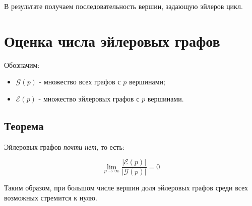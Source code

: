 {В результате получаем последовательность вершин, задающую эйлеров цикл.

\section*{Оценка числа эйлеровых графов}

Обозначим:
\begin{itemize}
  \item $\mathcal{G}(p)$ - множество всех графов с $p$ вершинами;
  \item $\mathcal{E}(p)$ - множество эйлеровых графов с $p$ вершинами.
\end{itemize}

\subsection*{Теорема}

Эйлеровых графов \emph{почти нет}, то есть:


\[
\lim_{p \to \infty} \frac{|\mathcal{E}(p)|}{|\mathcal{G}(p)|} = 0
\]



Таким образом, при большом числе вершин доля эйлеровых графов среди всех возможных стремится к нулю.


    \newpage
}
